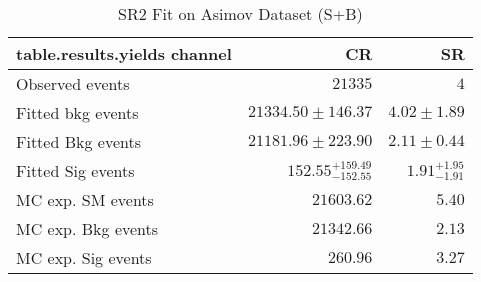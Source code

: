 

\begin{table}
\centering
\small
\begin{tabular*}{\textwidth}{@{\extracolsep{\fill}}lrr}
\toprule
\textbf{table.results.yields channel}           & CR            & SR              \\
\midrule
Observed events          & $21335$              & $4$                    \\
\midrule
Fitted bkg events         & $21334.50 \pm 146.37$          & $4.02 \pm 1.89$              \\
\midrule
        Fitted Bkg events         & $21181.96 \pm 223.90$          & $2.11 \pm 0.44$              \\
        Fitted Sig events         & $152.55_{-152.55}^{+159.49}$          & $1.91_{-1.91}^{+1.95}$              \\
 \midrule
MC exp. SM events              & $21603.62$          & $5.40$              \\
\midrule
        MC exp. Bkg events         & $21342.66$          & $2.13$              \\
        MC exp. Sig events         & $260.96$          & $3.27$              \\
\bottomrule
\end{tabular*}
\caption{SR2 Fit on Asimov Dataset (S+B)}
\label{}
\end{table}
%